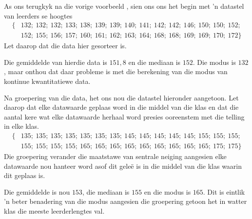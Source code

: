 As ons terugkyk na die vorige voorbeeld , sien ons ons het begin met ’n datastel van leerders se hoogtes
\begin{align*}
  \{&132;\ 132;\ 132;\ 133;\ 138;\ 139;\ 139;\ 140;\ 141;\ 142;\ 142;\ 146;\ 150;\ 150;\ 152;\\
    &152;\ 155;\ 156;\ 157;\ 160;\ 161;\ 162;\ 163;\ 164;\ 168;\ 168;\ 169;\ 169;\ 170;\ 172\}
\end{align*}
Let daarop dat die data hier gesorteer is.

Die gemiddelde van hierdie data is $151,8$ en die mediaan is $152$. Die modus is $132$, maar onthou dat daar probleme is met die berekening van die modus van kontinue kwantitatiewe data. \par

Na groepering van die data, het ons nou die datastel hieronder aangetoon. Let daarop dat elke datawaarde geplaas word in die middel van die klas en dat die aantal kere wat elke datawaarde herhaal word presies ooreenstem met die telling in elke klas. 
\begin{align*}
  \{&135;\ 135;\ 135;\ 135;\ 135;\ 135;\ 135;\ 145;\ 145;\ 145;\ 145;\ 145;\ 155;\ 155;\ 155;\\
    &155;\ 155;\ 155;\ 155;\ 165;\ 165;\ 165;\ 165;\ 165;\ 165;\ 165;\ 165;\ 165;\ 175;\ 175\}
\end{align*}
Die groepering verander die maatstawe van sentrale neiging aangesien elke datawaarde nou hanteer word asof dit geleë is in die middel van die klas waarin dit geplaas is. \par

Die gemiddelde is nou $153$, die mediaan is $155$ en die modus is $165$. Dit is eintlik ’n beter benadering van die modus aangesien die groepering getoon het in watter klas die meeste leerderlengtes val. 


